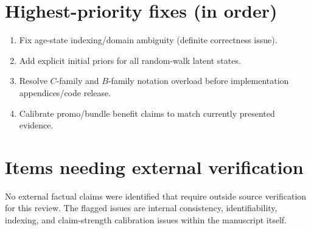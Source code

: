 \documentclass[11pt]{article}
\begin{document}
\section*{Highest-priority fixes (in order)}

\begin{enumerate}
  \item Fix age-state indexing/domain ambiguity (definite correctness issue).
  \item Add explicit initial priors for all random-walk latent states.
  \item Resolve $C$-family and $B$-family notation overload before implementation appendices/code release.
  \item Calibrate promo/bundle benefit claims to match currently presented evidence.
\end{enumerate}

\section*{Items needing external verification}

No external factual claims were identified that require outside source verification for this review.
The flagged issues are internal consistency, identifiability, indexing, and claim-strength calibration issues within the manuscript itself.
\end{document}
